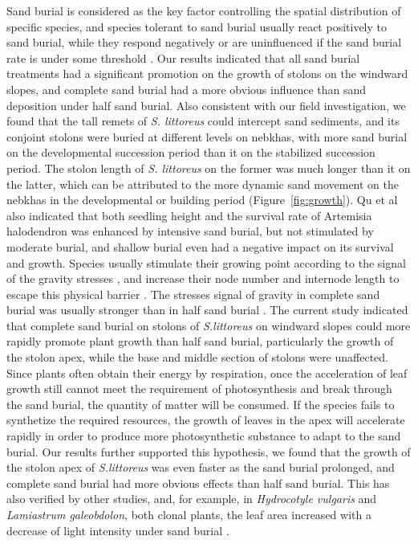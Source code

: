\documentclass[]{interact}
\theoremstyle{plain}%
\theoremstyle{definition}
\theoremstyle{remark}
\begin{document}
Sand burial is considered as the key factor controlling the spatial distribution of specific species, and species tolerant to sand burial usually react positively to sand burial, while they respond negatively or are uninfluenced if the sand burial rate is under some threshold \citep{hespReviewBiologicalGeomorphological1989, maunAdaptationsEnhancingSurvival1994,brownMechanismsSurvivingBurial2018}. 
Our results indicated that all sand burial treatments had a significant promotion on the growth of stolons on the windward slopes, and complete sand burial had a more obvious influence than sand deposition under half sand burial. Also consistent with our field investigation, we found that the tall remets of \textit{S. littoreus} could intercept sand sediments, and its conjoint stolons were buried at different levels on nebkhas, with more sand burial on the developmental succession period than it on the stabilized succession period. The stolon length of \textit{S. littoreus} on the former was much longer than it on the latter, which can be attributed to the more dynamic sand movement on the nebkhas in the developmental or building period (Figure~\ref{fig:growth}). Qu et al \citet{quEffectsSandBurial2017} also indicated that both seedling height and the survival rate of Artemisia halodendron was enhanced by intensive sand burial, but not stimulated by moderate burial, and shallow burial even had a negative impact on its survival and growth. Species usually stimulate their growing point according to the signal of the gravity stresses \citep{ruilinAnalysisGrowthStrategy2015}, and increase their node number and internode length to escape this physical barrier \citep{maunEffectsBurialSand1996}. The stresses signal of gravity in complete sand burial was usually stronger than in half sand burial \citep{wangAdvancesStudiesMorphological2005}. 
The current study indicated that complete sand burial on stolons of \textit{S.littoreus} on windward slopes could more rapidly promote plant growth than half sand burial, particularly the growth of the stolon apex, while the base and middle section of stolons were unaffected. Since plants often obtain their energy by respiration, once the acceleration of leaf growth still cannot meet the requirement of photosynthesis and break through the sand burial, the quantity of matter will be consumed. If the species fails to synthetize the required resources, the growth of leaves in the apex will accelerate rapidly in order to produce more photosynthetic substance to adapt to the sand burial. Our results further supported this hypothesis, we found that the growth of the stolon apex of \textit{S.littoreus} was even faster as the sand burial prolonged, and complete sand burial had more obvious effects than half sand burial. This has also verified by other studies, and, for example, in \textit{Hydrocotyle vulgaris} and \textit{Lamiastrum galeobdolon}, both clonal plants, the leaf area increased with a decrease of light intensity under sand burial \citep{dongMorphologicalResponsesLocal1995}. 
\end{document}
